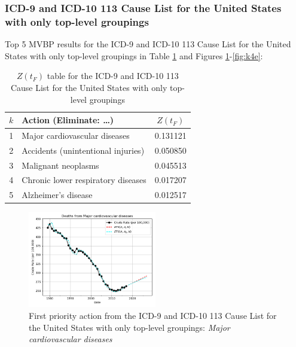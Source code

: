 \documentclass[10pt, a4paper, twocolumn]{IEEEconf}
\begin{document}
\clearpage

\subsubsection{ICD-9 and ICD-10 113 Cause List for the United States with only top-level groupings}

Top 5 MVBP results for the ICD-9 and ICD-10 113 Cause List for the United States with only top-level groupings in Table \ref{table:ztable3} and Figures \ref{fig:k4a}-\ref{fig:k4e}:

\begin{table}[H]
  \centering
  \begin{tabular}{clc}
    \toprule
      $k$ & Action (Eliminate: \ldots) & $Z(t_F)$ \\
    \midrule
      1 &      Major cardiovascular diseases & 0.131121 \\
      2 & Accidents (unintentional injuries) & 0.050850 \\
      3 &                Malignant neoplasms & 0.045513 \\
      4 & Chronic lower respiratory diseases & 0.017207 \\
      5 &                Alzheimer's disease & 0.012517 \\
    \bottomrule
  \end{tabular}
  \caption{$Z(t_F)$ table for the ICD-9 and ICD-10 113 Cause List for the United States with only top-level groupings}
  \label{table:ztable3}
\end{table}

\begin{figure}[H]
  \centering
  \includegraphics[width=0.5\textwidth]{results/US_ICD_113_SELECTED_CAUSES_ROOTS/Major_cardiovascular_diseases_ets.png}
  \caption{First priority action from the ICD-9 and ICD-10 113 Cause List for the United States with only top-level groupings: \textit{Major cardiovascular diseases}}\label{fig:k4a}
\end{figure}
\end{document}
